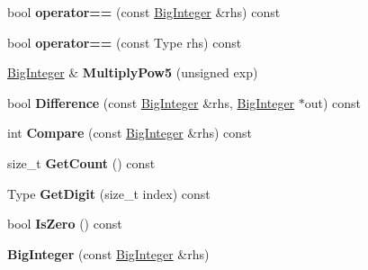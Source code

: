 \begin{DoxyCompactItemize}
\mbox{\label{classinternal_1_1BigInteger_a52b424669238bdebc134e793d3b470ae}} 
bool {\bfseries operator==} (const \hyperlink{classinternal_1_1BigInteger}{Big\+Integer} \&rhs) const
\item 
\mbox{\label{classinternal_1_1BigInteger_a8b6ab0d652d461c1136e0388d352628b}} 
bool {\bfseries operator==} (const Type rhs) const
\item 
\mbox{\label{classinternal_1_1BigInteger_a98a13f169c27d1acfa57054f37c61763}} 
\hyperlink{classinternal_1_1BigInteger}{Big\+Integer} \& {\bfseries Multiply\+Pow5} (unsigned exp)
\item 
\mbox{\label{classinternal_1_1BigInteger_ad7ad62e6b62af38283ee940eb4015b26}} 
bool {\bfseries Difference} (const \hyperlink{classinternal_1_1BigInteger}{Big\+Integer} \&rhs, \hyperlink{classinternal_1_1BigInteger}{Big\+Integer} $\ast$out) const
\item 
\mbox{\label{classinternal_1_1BigInteger_af8e90fff5382de6c1cda5f751017200c}} 
int {\bfseries Compare} (const \hyperlink{classinternal_1_1BigInteger}{Big\+Integer} \&rhs) const
\item 
\mbox{\label{classinternal_1_1BigInteger_aa0ad6e74839b7c7fe77c9742ec079525}} 
size\+\_\+t {\bfseries Get\+Count} () const
\item 
\mbox{\label{classinternal_1_1BigInteger_a7288eefd49735c3c3edec698f56738bd}} 
Type {\bfseries Get\+Digit} (size\+\_\+t index) const
\item 
\mbox{\label{classinternal_1_1BigInteger_ae12dd6759f1f76501db3d1bcafce39cd}} 
bool {\bfseries Is\+Zero} () const
\item 
\mbox{\label{classinternal_1_1BigInteger_abec623168bc9494dec2f50643b897f72}} 
{\bfseries Big\+Integer} (const \hyperlink{classinternal_1_1BigInteger}{Big\+Integer} \&rhs)
\item 
\mbox{\label{classinternal_1_1BigInteger_ad02b0ef9da203efddd4af07e923732c0}} 

\end{DoxyCompactItemize}
